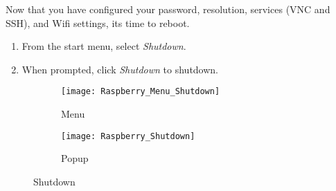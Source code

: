 \documentclass[
a4paper,
fontsize=14pt, %
pagesize, %
parskip=half-, %
]{scrartcl} %
\theoremstyle{mythmstyle} %
\begin{document}
Now that you have configured your password, resolution, services (VNC and SSH), and Wifi settings, its time to reboot.
\begin{enumerate}
    \item From the start menu, select \emph{Shutdown}.
    \item When prompted, click \emph{Shutdown} to \hypertarget{shutdown}{shutdown}.
\end{enumerate}
\begin{figure}[h]
    \begin{subfigure}{.5\textwidth}

               \centering\texttt{[image: Raspberry\_Menu\_Shutdown]}
               \caption{Menu}
 
    \end{subfigure}
    \begin{subfigure}{.5\textwidth}

                \centering\texttt{[image: Raspberry\_Shutdown]}
                \caption{Popup}

    \end{subfigure}
\caption{Shutdown}
\end{figure}

\clearpage
    
\end{document}
